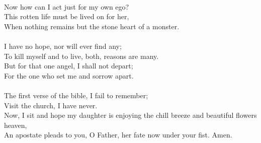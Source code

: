 \documentclass{article}
\begin{document}
\\Now how can I act just for my own ego? 
\\This rotten life must be lived on for her,
\\When nothing remains but the stone heart of a monster.
\\
\\I have no hope, nor will ever find any;
\\To kill myself and to live, both, reasons are many.
\\But for that one angel, I shall not depart;
\\For the one who set me and sorrow apart.
\\
\\The first verse of the bible, I fail to remember;
\\Visit the church, I have never.
\\Now, I sit and hope my daughter is enjoying the chill breeze and beautiful flowers heaven,
\\An apostate pleads to you, O Father, her fate now under your fist. Amen.
\end{document}
